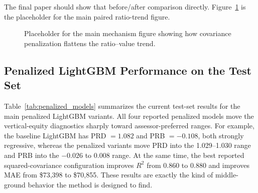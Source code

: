 \documentclass[12pt]{article}
\theoremstyle{plain}
\theoremstyle{definition}
\begin{document}
The final paper should show that before/after comparison directly. Figure~\ref{fig:penalty_mechanism_placeholder} is the placeholder for the main paired ratio-trend figure.

\begin{figure}[t]
\centering
{}
\caption{Placeholder for the main mechanism figure showing how covariance penalization flattens the ratio--value trend.}
\label{fig:penalty_mechanism_placeholder}
\end{figure}

\subsection{Penalized LightGBM Performance on the Test Set}

Table~\ref{tab:penalized_models} summarizes the current test-set results for the main penalized LightGBM variants. All four reported penalized models move the vertical-equity diagnostics sharply toward assessor-preferred ranges. For example, the baseline LightGBM has PRD \(=1.082\) and PRB \(=-0.108\), both strongly regressive, whereas the penalized variants move PRD into the 1.029--1.030 range and PRB into the \(-0.026\) to \(0.008\) range. At the same time, the best reported squared-covariance configuration improves \(R^2\) from \(0.860\) to \(0.880\) and improves MAE from \$73{,}398 to \$70{,}855. These results are exactly the kind of middle-ground behavior the method is designed to find.

\begin{table}[t]
\centering
\caption{Covariance-penalized LightGBM results on the test set. The reported \(\rho\) values are penalty-specific tuning parameters and are not directly comparable across penalty definitions.}
\label{tab:penalized_models}
\end{table}
\end{document}
